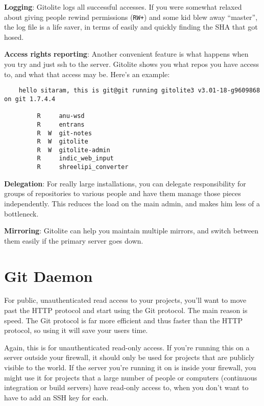 \documentclass[a4paper]{book}
\begin{document}
\textbf{Logging}: Gitolite logs all successful accesses. If you were somewhat relaxed about giving people rewind permissions (\texttt{RW+}) and some kid blew away “master”, the log file is a life saver, in terms of easily and quickly finding the SHA that got hosed.

\textbf{Access rights reporting}: Another convenient feature is what happens when you try and just ssh to the server. Gitolite shows you what repos you have access to, and what that access may be. Here's an example:

\begin{shaded}\begin{verbatim}
    hello sitaram, this is git@git running gitolite3 v3.01-18-g9609868 on git 1.7.4.4

         R     anu-wsd
         R     entrans
         R  W  git-notes
         R  W  gitolite
         R  W  gitolite-admin
         R     indic_web_input
         R     shreelipi_converter
\end{verbatim}\end{shaded}

\textbf{Delegation}: For really large installations, you can delegate responsibility for groups of repositories to various people and have them manage those pieces independently. This reduces the load on the main admin, and makes him less of a bottleneck.

\textbf{Mirroring}: Gitolite can help you maintain multiple mirrors, and switch between them easily if the primary server goes down.

\section{Git Daemon}

For public, unauthenticated read access to your projects, you'll want to move past the HTTP protocol and start using the Git protocol. The main reason is speed. The Git protocol is far more efficient and thus faster than the HTTP protocol, so using it will save your users time.

Again, this is for unauthenticated read-only access. If you're running this on a server outside your firewall, it should only be used for projects that are publicly visible to the world. If the server you're running it on is inside your firewall, you might use it for projects that a large number of people or computers (continuous integration or build servers) have read-only access to, when you don't want to have to add an SSH key for each.
\end{document}
